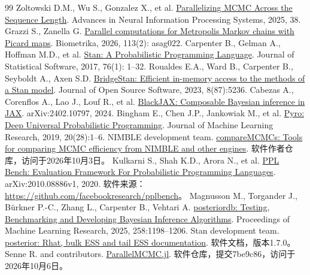 \begin{thebibliography}{99}\small\setlength{\itemsep}{2pt}
 Zoltowski D.M., Wu S., Gonzalez X., et al. \href{https://proceedings.nips.cc/paper_files/paper/2025/hash/202886ee1c9ca735cb5bff3a00a69883-Abstract-Conference.html}{Parallelizing MCMC Across the Sequence Length}. Advances in Neural Information Processing Systems, 2025, 38.
 Grazzi S., Zanella G. \href{https://doi.org/10.1093/biomet/asag022}{Parallel computations for Metropolis Markov chains with Picard maps}. Biometrika, 2026, 113(2): asag022.
 Carpenter B., Gelman A., Hoffman M.D., et al. \href{https://doi.org/10.18637/jss.v076.i01}{Stan: A Probabilistic Programming Language}. Journal of Statistical Software, 2017, 76(1): 1--32.
 Roualdes E.A., Ward B., Carpenter B., Seyboldt A., Axen S.D. \href{https://doi.org/10.21105/joss.05236}{BridgeStan: Efficient in-memory access to the methods of a Stan model}. Journal of Open Source Software, 2023, 8(87):5236.
 Cabezas A., Corenflos A., Lao J., Louf R., et al. \href{https://arxiv.org/abs/2402.10797}{BlackJAX: Composable Bayesian inference in JAX}. arXiv:2402.10797, 2024.
 Bingham E., Chen J.P., Jankowiak M., et al. \href{https://jmlr.org/papers/v20/18-403.html}{Pyro: Deep Universal Probabilistic Programming}. Journal of Machine Learning Research, 2019, 20(28):1--6.
 NIMBLE development team. \href{https://github.com/nimble-dev/compareMCMCs}{compareMCMCs: Tools for comparing MCMC efficiency from NIMBLE and other engines}. 软件作者仓库，访问于2026年10月3日。
 Kulkarni S., Shah K.D., Arora N., et al. \href{https://arxiv.org/abs/2010.08886v1}{PPL Bench: Evaluation Framework For Probabilistic Programming Languages}. arXiv:2010.08886v1, 2020. 软件来源：\url{https://github.com/facebookresearch/pplbench}。
 Magnusson M., Torgander J., Bürkner P.-C., Zhang L., Carpenter B., Vehtari A. \href{https://proceedings.mlr.press/v258/magnusson25a.html}{posteriordb: Testing, Benchmarking and Developing Bayesian Inference Algorithms}. Proceedings of Machine Learning Research, 2025, 258:1198--1206.
 Stan development team. \href{https://mc-stan.org/posterior/reference/rhat.html}{posterior: Rhat, bulk ESS and tail ESS documentation}. 软件文档，版本1.7.0。
 Senne R. and contributors. \href{https://github.com/rsenne/ParallelMCMC.jl/tree/7be9c866c8be03ad994a5e7f0486ec3290088813}{ParallelMCMC.jl}. 软件仓库，提交7be9c86，访问于2026年10月6日。

\end{thebibliography}
